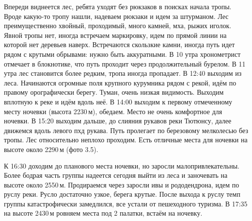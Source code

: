     Впереди виднеется лес, ребята уходят без рюкзаков в поисках начала тропы. Вроде какую-то тропу нашли, надеваем
    рюкзаки и идем за штурманом. Лес преимущественно хвойный, проходимый, много камней, мха, рыжих иголок. Явной тропы
    нет, иногда встречаем маркировку, идем по прямой линии на которой нет деревьев наверх. Встречаются скользкие камни,
    иногда путь идет рядом с крутыми обрывами: нужно быть аккуратными. В 10 утра хронометрист отмечает в блокнотике,
    что путь проходит через продолжительный бурелом. В 11 утра лес становится более редким, тропа иногда пропадает.
    В 12:40 выходим из леса. Начинаются огромные поля крупного курумника рядом с рекой, идём по правому орографически
    берегу. Туман, очень низкая видимость. Выходим вплотную к реке и идём вдоль неё. В 14:00 выходим к первому отмеченному
    месту ночевки (высота 2230\,м), обедаем. Место не очень комфортное для ночевки. В 15:20 выходим дальше, до слияния
    рукавов реки Тютюнсу, далее движемся вдоль левого пхд рукава. Путь пролегает по березовому мелколесью без тропы. Лес
    относительно неплохо проходим. Есть отличные места для ночевки на высоте около 2290\,м (фото 3.5).

    К 16:30 доходим до планового места ночевки, но заросли малопривлекательны. Более бодрая часть группы надеется сегодня
    выйти из леса и заночевать на высоте около 2550\,м. Продираемся через заросли ивы и рододендрона, идем по руслу реки.
    Русло достаточно узкое, берега крутые. После выхода к руслу темп группы катастрофически замедлился, все устали от
    пешеходного туризма. В 17:35 на высоте 2430\,м ровняем места под 2 палатки, встаём на ночевку.

    \FloatBarrier






